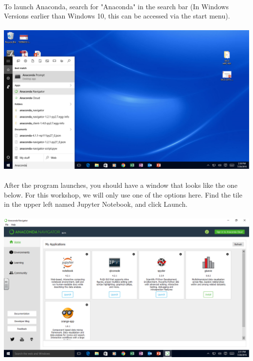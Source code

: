 \documentclass[]{article}
\begin{document}
\paragraph{}
To launch Anaconda, search for "Anaconda" in the search bar (In Windows Versions earlier than Windows 10, this can be accessed via the start menu).
\paragraph{}
\begin{centering}
    \centerline{\includegraphics[scale=0.35]{Screenshot_13.png}}
\end{centering}

\paragraph{}
After the program launches, you should have a window that looks like the one below. For this workshop, we will only use one of the options here. Find the tile in the upper left named Jupyter Notebook, and click Launch.
\paragraph{}
\begin{centering}
    \centerline{\includegraphics[scale=0.35]{Screenshot_14.png}}
\end{centering}
\end{document}
